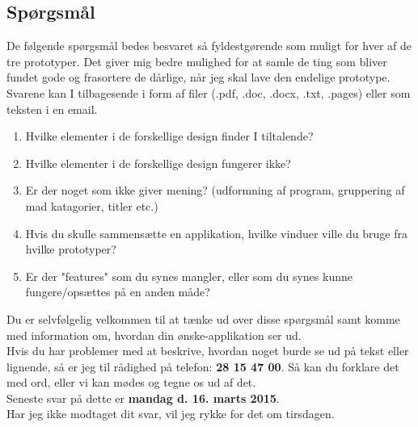 \documentclass[a4paper,10pt,titlepage]{article}
\begin{document}
\subsection*{Spørgsmål}
De følgende spørgsmål bedes besvaret så fyldestgørende som muligt for hver af de tre prototyper. Det giver mig bedre mulighed for at samle de ting som bliver fundet gode og frasortere de dårlige, når jeg skal lave den endelige prototype. Svarene kan I tilbagesende i form af filer (.pdf, .doc, .docx, .txt, .pages) eller som teksten i en email. 
\begin{enumerate}
\item
Hvilke elementer i de forskellige design finder I tiltalende?
\item
Hvilke elementer i de forskellige design fungerer ikke?
\item
Er der noget som ikke giver mening? (udformning af program, gruppering af mad katagorier, titler etc.)
\item
Hvis du skulle sammensætte en applikation, hvilke vinduer ville du bruge fra hvilke prototyper?
\item
Er der "features" som du synes mangler, eller som du synes kunne fungere/opsættes på en anden måde?
\end{enumerate}
Du er selvfølgelig velkommen til at tænke ud over disse spørgsmål samt komme med information om, hvordan din ønske-applikation ser ud.\\
Hvis du har problemer med at beskrive, hvordan noget burde se ud på tekst eller lignende, så er jeg til rådighed på telefon: \textbf{28 15 47 00}. Så kan du forklare det med ord, eller vi kan mødes og tegne os ud af det.\\

Seneste svar på dette er \textbf{mandag d. 16. marts 2015}. \\
Har jeg ikke modtaget dit svar, vil jeg rykke for det om tirsdagen.
\end{document}
